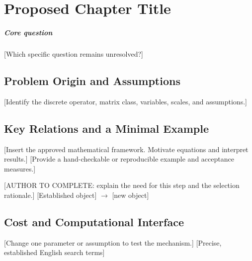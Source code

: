 \chapter{Proposed Chapter Title}\label{template:v0}
\begin{chaptersummary}
\end{chaptersummary}
\paragraph{Core question} [Which specific question remains unresolved?]

\section{Problem Origin and Assumptions}
[Identify the discrete operator, matrix class, variables, scales, and assumptions.]

\section{Key Relations and a Minimal Example}
[Insert the approved mathematical framework. Motivate equations and interpret results.]
[Provide a hand-checkable or reproducible example and acceptance measures.]

{[AUTHOR TO COMPLETE: explain the need for this step and the selection rationale.]}
{[Established object] $\longrightarrow$ [new object]}

\section{Cost and Computational Interface}
{[Change one parameter or assumption to test the mechanism.]}
{[Precise, established English search terms]}
